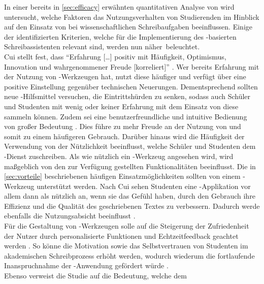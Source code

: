 \documentclass[../main.tex]{subfiles}
\begin{document}
In einer bereits in \autoref{sec:efficacy} erwähnten quantitativen Analyse von \textcite{influencingUsingAi} wird untersucht, welche Faktoren das Nutzungsverhalten von Studierenden im Hinblick auf den 
Einsatz von   bei wissenschaftlichen Schreibaufgaben beeinflussen. Einige der identifizierten Kriterien, welche für die Implementierung des -basierten Schreibassistenten relevant sind, werden nun \mbox{näher beleuchtet.} \\ 
Cui stellt fest, dass "`Erfahrung […] positiv mit Häufigkeit, Optimismus, Innovation und wahrgenommener Freude [korreliert]"' \cite[6]{influencingUsingAi}. Wer bereits 
Erfahrung mit der Nutzung von -Werkzeugen hat, nutzt diese häufiger und verfügt über eine positive Einstellung gegenüber technischen Neuerungen. Dementsprechend 
sollten neue -Hilfsmittel versuchen, die Eintrittshürden zu senken, sodass auch Schüler und Studenten mit wenig oder keiner Erfahrung mit dem Einsatz von  diese 
sammeln können. Zudem sei eine benutzerfreundliche und intuitive Bedienung von großer Bedeutung \cite[6]{influencingUsingAi}. Dies führe zu mehr Freude an der Nutzung 
von  und somit zu einem häufigeren Gebrauch. Darüber hinaus wird die Häufigkeit der Verwendung von der Nützlichkeit beeinflusst, welche Schüler und Studenten 
dem -Dienst zuschreiben. Als wie nützlich ein -Werkzeug angesehen wird, wird maßgeblich von den zur Verfügung gestellten Funktionalitäten beeinflusst. Die in 
\autoref{sec:vorteile} beschriebenen häufigen Einsatzmöglichkeiten sollten von einem -Werkzeug unterstützt werden. Nach Cui sehen Studenten eine -Applikation vor allem dann 
als nützlich an, wenn sie das Gefühl haben, durch den Gebrauch ihre Effizienz und die Qualität des geschriebenen Textes zu verbessern. Dadurch werde ebenfalls die 
Nutzungsabsicht beeinflusst \cite[7]{influencingUsingAi}. \\
Für die Gestaltung von -Werkzeugen solle auf die Steigerung der Zufriedenheit der Nutzer durch personalisierte Funktionen und Echtzeitfeedback geachtet 
werden \cite[10]{influencingUsingAi}. So könne die Motivation sowie das Selbstvertrauen von Studenten im akademischen Schreibprozess erhöht werden, wodurch 
wiederum die fortlaufende Inanspruchnahme der -Anwendung gefördert würde \cite[10]{influencingUsingAi}. \\Ebenso verweist die Studie auf die Bedeutung, welche dem 
\end{document}
